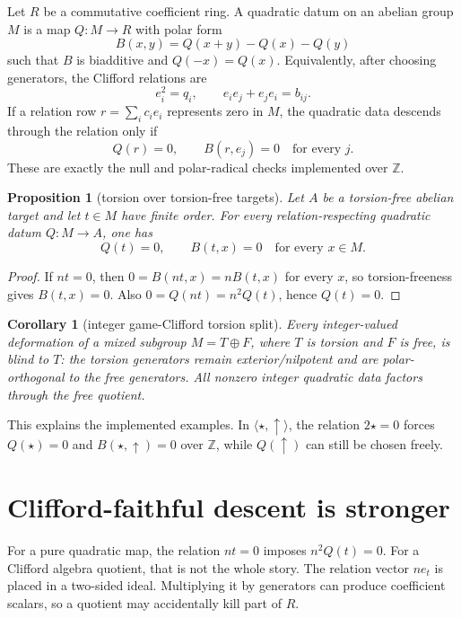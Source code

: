 \documentclass[11pt]{article}
\newtheorem{proposition}[theorem]{Proposition}
\newtheorem{corollary}[theorem]{Corollary}
\theoremstyle{remark}
\newcommand{\Z}{\mathbb{Z}}
\begin{document}
Let $R$ be a commutative coefficient ring.  A quadratic datum on an abelian
group $M$ is a map $Q\colon M\to R$ with polar form
\[
  B(x,y)=Q(x+y)-Q(x)-Q(y)
\]
such that $B$ is biadditive and $Q(-x)=Q(x)$.  Equivalently, after choosing
generators, the Clifford relations are
\[
  e_i^2=q_i,\qquad e_i e_j+e_j e_i=b_{ij}.
\]
If a relation row $r=\sum_i c_i e_i$ represents zero in $M$, the quadratic data
descends through the relation only if
\[
  Q(r)=0,\qquad B(r,e_j)=0\quad\text{for every }j.
\]
These are exactly the null and polar-radical checks implemented over $\Z$.

\begin{proposition}[torsion over torsion-free targets]\label{prop:tf}
Let $A$ be a torsion-free abelian target and let $t\in M$ have finite
order.  For every relation-respecting quadratic datum $Q\colon M\to A$, one
has
\[
  Q(t)=0,\qquad B(t,x)=0\quad\text{for every }x\in M.
\]
\end{proposition}

\begin{proof}
If $nt=0$, then $0=B(nt,x)=nB(t,x)$ for every $x$, so torsion-freeness gives
$B(t,x)=0$.  Also $0=Q(nt)=n^2Q(t)$, hence $Q(t)=0$.
\end{proof}

\begin{corollary}[integer game-Clifford torsion split]\label{cor:intsplit}
Every integer-valued deformation of a mixed subgroup
$M=T\oplus F$, where $T$ is torsion and $F$ is free, is blind to $T$: the
torsion generators remain exterior/nilpotent and are polar-orthogonal to the
free generators.  All nonzero integer quadratic data factors through the free
quotient.
\end{corollary}

This explains the implemented examples.  In $\langle \star,\uparrow\rangle$,
the relation $2\star=0$ forces $Q(\star)=0$ and $B(\star,\uparrow)=0$ over
$\Z$, while $Q(\uparrow)$ can still be chosen freely.

\section{Clifford-faithful descent is stronger}

For a pure quadratic map, the relation $nt=0$ imposes $n^2Q(t)=0$.  For a
Clifford algebra quotient, that is not the whole story.  The relation vector
$ne_t$ is placed in a two-sided ideal.  Multiplying it by generators can produce
coefficient scalars, so a quotient may accidentally kill part of $R$.
\end{document}
